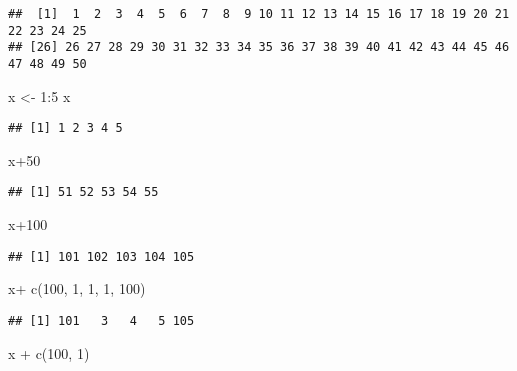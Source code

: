 \documentclass[
]{article}
\newenvironment{Shaded}{\begin{snugshade}}{\end{snugshade}}
\newcommand{\DecValTok}[1]{\textcolor[rgb]{0.00,0.00,0.81}{#1}}
\newcommand{\FunctionTok}[1]{\textcolor[rgb]{0.00,0.00,0.00}{#1}}
\newcommand{\NormalTok}[1]{#1}
\newcommand{\OtherTok}[1]{\textcolor[rgb]{0.56,0.35,0.01}{#1}}
\newcommand{\SpecialCharTok}[1]{\textcolor[rgb]{0.00,0.00,0.00}{#1}}
\begin{document}
\begin{verbatim}
##  [1]  1  2  3  4  5  6  7  8  9 10 11 12 13 14 15 16 17 18 19 20 21 22 23 24 25
## [26] 26 27 28 29 30 31 32 33 34 35 36 37 38 39 40 41 42 43 44 45 46 47 48 49 50
\end{verbatim}

\begin{Shaded}
\begin{Highlighting}[]
\NormalTok{x }\OtherTok{\textless{}{-}} \DecValTok{1}\SpecialCharTok{:}\DecValTok{5}
\NormalTok{x}
\end{Highlighting}
\end{Shaded}

\begin{verbatim}
## [1] 1 2 3 4 5
\end{verbatim}

\begin{Shaded}
\begin{Highlighting}[]
\NormalTok{x}\SpecialCharTok{+}\DecValTok{50}
\end{Highlighting}
\end{Shaded}

\begin{verbatim}
## [1] 51 52 53 54 55
\end{verbatim}

\begin{Shaded}
\begin{Highlighting}[]
\NormalTok{x}\SpecialCharTok{+}\DecValTok{100}
\end{Highlighting}
\end{Shaded}

\begin{verbatim}
## [1] 101 102 103 104 105
\end{verbatim}

\begin{Shaded}
\begin{Highlighting}[]
\NormalTok{x}\SpecialCharTok{+} \FunctionTok{c}\NormalTok{(}\DecValTok{100}\NormalTok{, }\DecValTok{1}\NormalTok{, }\DecValTok{1}\NormalTok{, }\DecValTok{1}\NormalTok{, }\DecValTok{100}\NormalTok{)}
\end{Highlighting}
\end{Shaded}

\begin{verbatim}
## [1] 101   3   4   5 105
\end{verbatim}

\begin{Shaded}
\begin{Highlighting}[]
\NormalTok{x }\SpecialCharTok{+} \FunctionTok{c}\NormalTok{(}\DecValTok{100}\NormalTok{, }\DecValTok{1}\NormalTok{)}
\end{Highlighting}
\end{Shaded}
\end{document}
